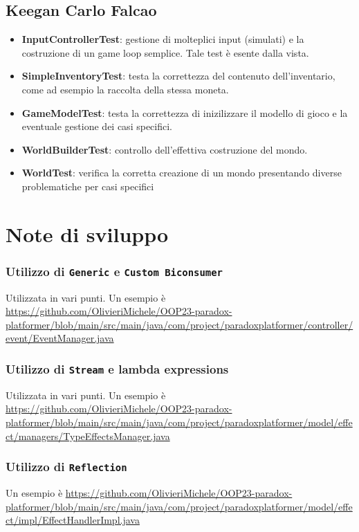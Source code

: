\documentclass[a4paper,12pt]{report}
\begin{document}
\subsection*{Keegan Carlo Falcao}

\begin{itemize}
	\item \textbf{InputControllerTest}: gestione di molteplici input (simulati) e la costruzione di un game loop semplice. Tale test è esente dalla vista.
	
	\item \textbf{SimpleInventoryTest}: testa la correttezza del contenuto dell'inventario, come ad esempio la raccolta della stessa moneta.
	
	\item \textbf{GameModelTest}: testa la correttezza di inizilizzare il modello di gioco e la eventuale gestione dei casi specifici.
	
	\item \textbf{WorldBuilderTest}: controllo dell'effettiva costruzione del mondo.
	
	\item \textbf{WorldTest}: verifica la corretta creazione di un mondo presentando diverse problematiche per casi specifici
	\end{itemize}

\section{Note di sviluppo}

\subsubsection{Utilizzo di \texttt{Generic} e \texttt{Custom Biconsumer}}
Utilizzata in vari punti.
Un esempio è 
\url{https://github.com/OlivieriMichele/OOP23-paradox-platformer/blob/main/src/main/java/com/project/paradoxplatformer/controller/event/EventManager.java}

\subsubsection{Utilizzo di \texttt{Stream} e lambda expressions}
Utilizzata in vari punti.
Un esempio è 
\url{https://github.com/OlivieriMichele/OOP23-paradox-platformer/blob/main/src/main/java/com/project/paradoxplatformer/model/effect/managers/TypeEffectsManager.java}

\subsubsection{Utilizzo di \texttt{Reflection}}
Un esempio è 
\url{https://github.com/OlivieriMichele/OOP23-paradox-platformer/blob/main/src/main/java/com/project/paradoxplatformer/model/effect/impl/EffectHandlerImpl.java}
\end{document}
